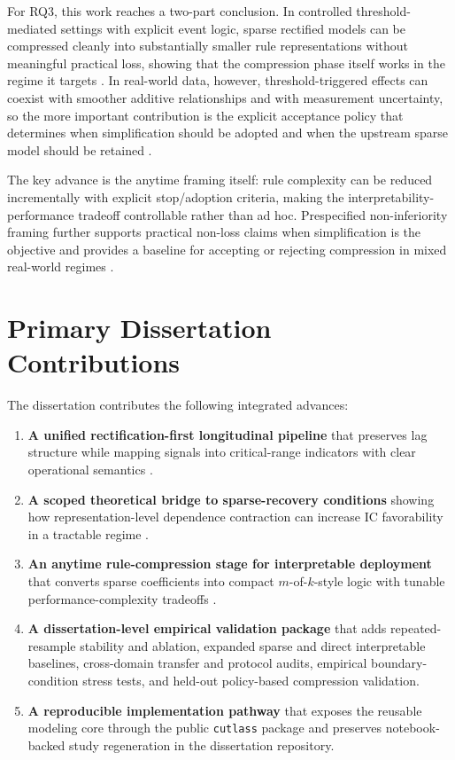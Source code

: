 For RQ3, this work reaches a two-part conclusion. In controlled threshold-mediated settings with explicit event logic, sparse rectified models can be compressed cleanly into substantially smaller rule representations without meaningful practical loss, showing that the compression phase itself works in the regime it targets \autocite{JOrender2025Anytime,JOrender2025Efficient}. In real-world data, however, threshold-triggered effects can coexist with smoother additive relationships and with measurement uncertainty, so the more important contribution is the explicit acceptance policy that determines when simplification should be adopted and when the upstream sparse model should be retained \autocite{CRudin2019Stop,WJMurdoch2019Definitions}.

The key advance is the anytime framing itself: rule complexity can be reduced incrementally with explicit stop/adoption criteria, making the interpretability-performance tradeoff controllable rather than ad hoc. Prespecified non-inferiority framing further supports practical non-loss claims when simplification is the objective and provides a baseline for accepting or rejecting compression in mixed real-world regimes \autocite{DJSchuirmann1987comparison,Student1908probable}.

\section{Primary Dissertation Contributions}

The dissertation contributes the following integrated advances:
\begin{enumerate}
	\item \textbf{A unified rectification-first longitudinal pipeline} that preserves lag structure while mapping signals into critical-range indicators with clear operational semantics \autocite{orender2022,JOrender2025Efficient}.
	\item \textbf{A scoped theoretical bridge to sparse-recovery conditions} showing how representation-level dependence contraction can increase IC favorability in a tractable regime \autocite{PZhao2006model,JOrender2025Efficient}.
	\item \textbf{An anytime rule-compression stage for interpretable deployment} that converts sparse coefficients into compact $m$-of-$k$-style logic with tunable performance-complexity tradeoffs \autocite{JOrender2025Anytime}.
	\item \textbf{A dissertation-level empirical validation package} that adds repeated-resample stability and ablation, expanded sparse and direct interpretable baselines, cross-domain transfer and protocol audits, empirical boundary-condition stress tests, and held-out policy-based compression validation.
	\item \textbf{A reproducible implementation pathway} that exposes the reusable modeling core through the public \texttt{cutlass} package and preserves notebook-backed study regeneration in the dissertation repository.
\end{enumerate}

